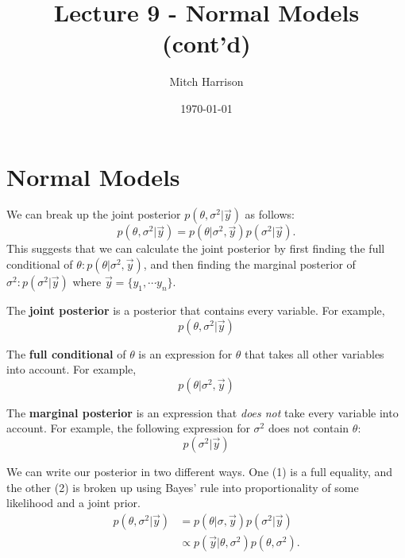 \documentclass[titlepage, 12pt, leqno]{article}
\title{\Huge{Lecture 9 - Normal Models (cont'd)}}
\author{\large{Mitch Harrison}}
\date{\today}
\begin{document}
\setlength{\parskip}{1\baselineskip}
\setlength{\parindent}{15pt}
\maketitle
\tableofcontents
\newpage


\section{Normal Models}

We can break up the joint posterior $p(\theta,\sigma^{2}|\vec y)$ as follows:
\[
p(\theta,\sigma^{2}|\vec y) = p(\theta|\sigma^{2},\vec y)p(\sigma^{2}|\vec y).
\]
This suggests that we can calculate the joint posterior by first finding the 
full conditional of $\theta: p(\theta|\sigma^{2},\vec y)$, and then finding the
marginal posterior of $\sigma^{2}:p(\sigma^{2}|\vec y)$ where $\vec y = \{y_{1},
\cdots y_{n}\}$.

\begin{definition}
    The \textbf{joint posterior} is a posterior that contains every variable. For
    example,
    \[
        p(\theta,\sigma^{2}|\vec y)
    \]
\end{definition}

\begin{definition}
    The \textbf{full conditional} of $\theta$ is an expression for $\theta$ that
    takes all other variables into account. For example,
    \[
    p(\theta|\sigma^{2},\vec y)
    \]
\end{definition}

\begin{definition}
    The \textbf{marginal posterior} is an expression that \textit{does not} take
    every variable into account. For example, the following expression for
    $\sigma^{2}$ does not contain $\theta$:
    \[
        p(\sigma^{2}|\vec y)
    \]
\end{definition}

We can write our posterior in two different ways. One (1) is a full equality, and
the other (2) is broken up using Bayes' rule into proportionality of some
likelihood and a joint prior.
\begin{align}
    p(\theta,\sigma^{2}|\vec y) &= p(\theta|\sigma,\vec y)p(\sigma^{2}|\vec y)\\
                        &\propto p(\vec y|\theta,\sigma^{2})p(\theta,\sigma^{2}).
\end{align}
\end{document}
